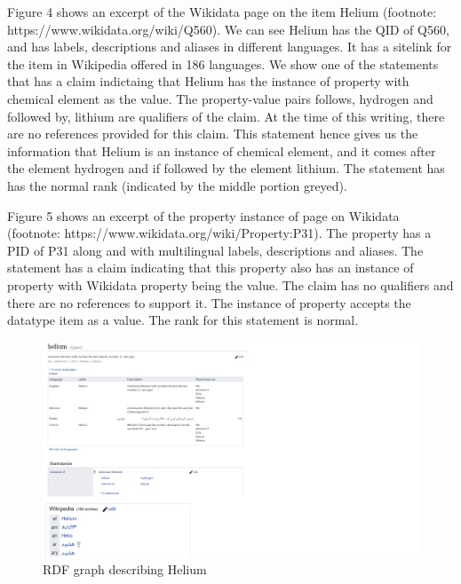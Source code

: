 Figure 4 shows an excerpt of the Wikidata page on the item Helium (footnote: https://www.wikidata.org/wiki/Q560). We can see Helium has the QID of Q560, and has labels, descriptions and aliases in different languages. It has a sitelink for the item in Wikipedia offered in 186 languages. We show one of the statements that has a claim indictaing that Helium has the instance of property with chemical element as the value. The property-value pairs follows, hydrogen and followed by, lithium are qualifiers of the claim. At the time of this writing, there are no references provided for this claim. This statement hence gives us the information that Helium is an instance of chemical element, and it comes after the element hydrogen and if followed by the element lithium. The statement has has the normal rank (indicated by the middle portion greyed). 

Figure 5 shows an excerpt of the property instance of page on Wikidata (footnote: https://www.wikidata.org/wiki/Property:P31). The property has a PID of P31 along and with multilingual labels, descriptions and aliases. The statement has a claim indicating that this property also has an instance of property with Wikidata property being the value. The claim has no qualifiers and there are no references to support it. The instance of property accepts the datatype item as a value. The rank for this statement is normal.

\begin{figure}[h]
  \centering
  \includegraphics[width=0.75 \linewidth]{images/helium.pdf}
  \caption{RDF graph describing Helium}
  \label{fig:figure 3}
\end{figure}

